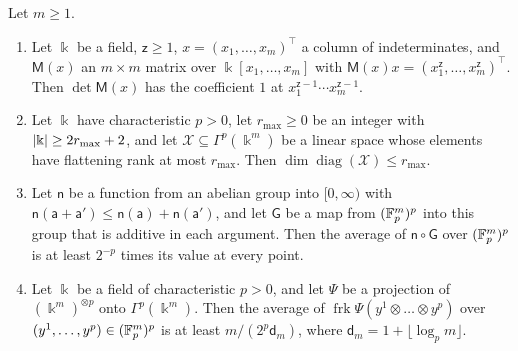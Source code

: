 \begin{lemma}\label{amb:lem:projections}
Let $m\ge1$.
\begin{enumerate}
\item Let $\Bbbk$ be a field, $\mathsf z\ge1$, $x=(x_1,\dots,x_m)^{\top}$ a column of indeterminates, and $\mathsf M(x)$
an $m\times m$ matrix over $\Bbbk[x_1,\dots,x_m]$ with $\mathsf M(x)x=(x_1^{\mathsf z},\dots,x_m^{\mathsf z})^{\top}$. Then $\det\mathsf M(x)$ has the coefficient $1$ at
$x_1^{\mathsf z-1}\cdots x_m^{\mathsf z-1}$.
\item Let $\Bbbk$ have characteristic $p>0$, let $r_{\max}\ge0$ be an integer with $\lvert \Bbbk\rvert\ge2r_{\max}+2$, and let
$\mathcal X\subseteq\Gamma^p(\Bbbk^m)$ be a linear space whose elements have flattening rank at most $r_{\max}$. Then
$\dim\operatorname{diag}(\mathcal X)\le r_{\max}$.
\item Let $\mathsf n$ be a function from an abelian group into $[0,\infty)$ with $\mathsf n(\mathsf a+\mathsf a')\le\mathsf n(\mathsf a)+\mathsf n(\mathsf a')$, and let $\mathsf G$ be a
map from $(\mathbb F_p^m)^p$ into this group that is additive in each argument. Then the average of $\mathsf n\circ\mathsf G$ over
$(\mathbb F_p^m)^p$ is at least $2^{-p}$ times its value at every point.
\item Let $\Bbbk$ be a field of characteristic $p>0$, and let $\Psi$ be a projection of $(\Bbbk^m)^{\otimes p}$ onto
$\Gamma^p(\Bbbk^m)$. Then the average of $\operatorname{frk}\Psi(y^1\otimes\dots\otimes y^p)$ over
$(y^1,\dots,y^p)\in(\mathbb F_p^m)^p$ is at least $m/(2^p\mathsf d_m)$, where $\mathsf d_m=1+\lfloor\log_pm\rfloor$.
\end{enumerate}
\end{lemma}

